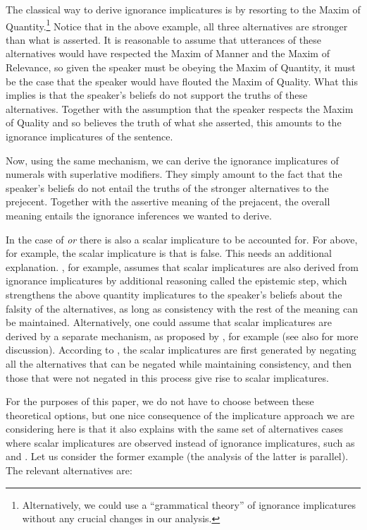 \documentclass[output=paper]{langscibook}
\begin{document}
The classical way to derive ignorance implicatures is by resorting to the Maxim of Quantity.\footnote{Alternatively, we could use a ``grammatical theory'' of ignorance implicatures \citep{meyer, buccolahaida} without any crucial changes in our analysis.} Notice that in the above example, all three alternatives are stronger than what is asserted. It is reasonable to assume that utterances of these alternatives would have respected the Maxim of Manner and the Maxim of Relevance, so given the speaker must be obeying the Maxim of Quantity, it must be the case that the speaker would have flouted the Maxim of Quality. What this implies is that the speaker's beliefs do not support the truths of these alternatives.  Together with the assumption that the speaker respects the Maxim of Quality and so believes the truth of what she asserted, this amounts to the ignorance implicatures of the sentence.

Now, using the same mechanism, we can derive the ignorance implicatures of numerals with superlative modifiers. They simply amount to the fact that the speaker's beliefs do not entail the truths of the stronger alternatives to the prejecent. Together with the assertive meaning of the prejacent, the overall meaning entails the ignorance inferences we wanted to derive.

In the case of \textit{or} there is also a scalar implicature to be accounted for. For  above, for example, the scalar implicature is that  is false. This needs an additional explanation.  \citet{sauerland}, for example, assumes that scalar implicatures are also derived from ignorance implicatures by additional reasoning called the epistemic step, which strengthens the above quantity implicatures to the speaker's beliefs about the falsity of the alternatives, as long as consistency with the rest of the meaning can be maintained. Alternatively, one could assume that scalar implicatures are derived by a separate mechanism, as proposed by \citet{fox}, for example (see also \citet{buccolahaida} for more discussion). According to \citet{fox}, the scalar implicatures are first generated by negating all the alternatives that can be negated while maintaining consistency, and then those that were not negated in this process give rise to scalar implicatures.

For the purposes of this paper, we do not have to choose between these theoretical options, but one nice consequence of the implicature approach we are considering here is that it also explains with the same set of alternatives cases where scalar implicatures are observed instead of ignorance implicatures, such as  and . Let us consider the former example (the analysis of the latter is parallel). The relevant alternatives are:
\end{document}

